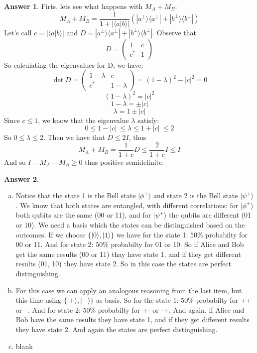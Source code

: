 \documentclass[12pt]{article}
\newcommand{\ket}[1]{|#1\rangle}
\newcommand{\bra}[1]{\langle#1|}
\newcommand{\braket}[2]{\langle  #1 |#2 \rangle}
\theoremstyle{plain}
\theoremstyle{definition}
\newtheorem{ans}{Answer}
\begin{document}
\begin{ans}
	Firts, lets see what happens with $M_A + M_B$:
    \[M_A + M_B = \frac{1}{1+\left\lvert \braket{a}{b}\right\rvert} (\ket{a^\perp}\bra{a^\perp} + \ket{b^\perp}\bra{b^\perp})\]
    Let's call $c = \left\lvert \braket{a}{b}\right\rvert$ and $D = \ket{a^\perp}\bra{a^\perp} + \ket{b^\perp}\bra{b^\perp}$.
    Observe that
    \[D = \begin{pmatrix}
        1 & c \\
        c^* & 1
        \end{pmatrix}\]
    So calculating the eigenvalues for D, we have:
    \[\det D = \begin{pmatrix}
        1-\lambda & c \\
        c^* &  1-\lambda
        \end{pmatrix} = (1-\lambda)^2 - \left\lvert c \right\rvert^2 = 0 \] 
    \[ (1-\lambda)^2 = \left\lvert c \right\rvert^2 \] 
    \[ 1-\lambda = \pm \left\lvert c \right\rvert\]
    \[ \lambda = 1 \pm \left\lvert c \right\rvert\]
    Since $c \leq 1$, we know that the eigenvalue $\lambda$ satisfy: 
    \[ 0 \leq 1 - \left\lvert c \right\rvert\ \leq \lambda \leq 1 + \left\lvert c \right\rvert\ \leq 2\]
    So $0 \leq \lambda \leq 2$. Then we have that $D \leq 2I$, thus
    \[M_A + M_B = \frac{1}{1+c}D \leq \frac{2}{1+c}I \leq I\]
    And so $I-M_A - M_B \geq 0 $ thus positive semidefinite.
\end{ans}

\noindent \hrulefill

\begin{ans}
	\begin{enumerate}[(a)]
        \item Notice that the state 1 is the Bell state $\ket{\phi^+}$ and state 2 is 
            the Bell state $\ket{\psi^+}$. We know that both states are entangled, with
            different correlations: for $\ket{\phi^+}$ both qubits are the same (00 or 11), 
            and for $\ket{\psi^+}$ the qubits are different (01 or 10). We need a basis
            which the states can be distinguished based on the outcomes. If we choose 
            $\{ \ket{0}, \ket{1}\}$ we have for the state 1: $50\%$ probabilty for 00 or 11.
            And for state 2: $50\%$ probabilty for 01 or 10. So if Alice and Bob get the 
            same results (00 or 11) thay have state 1, and if they get different results (01, 10) 
            they have state 2. So in this case the states are perfect distinguishing.
        \item For this case we can apply an analogous reasoning from the last item, but 
            this time using $\{ \ket{+}, \ket{-}\}$ as basis. So for the state 1: $50\%$ probabilty for ++ or --.
            And for state 2: $50\%$ probabilty for +- or -+. And again, if Alice and Bob
            have the same results they have state 1, and if they get different results they have state 2.
            And again the states are perfect distinguishing.
        \item blank
    \end{enumerate}
\end{ans}
\end{document}
